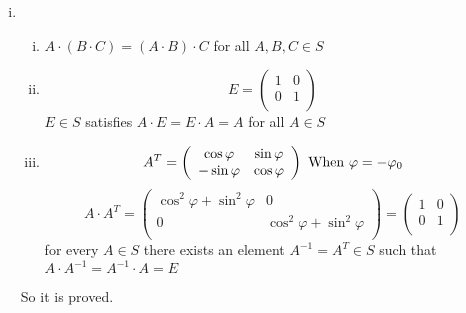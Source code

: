 \documentclass{article}
\begin{document}
\section{}
\begin{enumerate}[i)]
\item
\begin{enumerate}[(i)]
\item
$A\cdot(B\cdot C)=(A\cdot B)\cdot C$ for all $A,B,C\in S$
\item
\begin{equation*}
E=\left(
\begin{array}{cc}
1 & 0\\
0 & 1\\
\end{array}
\right)
\end{equation*}
$E\in S$ satisfies $A\cdot E=E\cdot A=A$ for all $A\in S$
\item
\begin{equation*}
A^T=\left(
\begin{array}{cc}
\cos\varphi & \sin\varphi\\
-\sin\varphi& \cos\varphi\\
\end{array}
\right)\ \rm{When}\ \varphi=-\varphi_0
\end{equation*}
\begin{equation*}
A\cdot A^T=\left(
\begin{array}{cc}
\cos^2\varphi+\sin^2\varphi & 0\\
0 & \cos^2\varphi+\sin^2\varphi\\
\end{array}
\right)=\left(
\begin{array}{cc}
1 & 0\\
0 & 1\\
\end{array}
\right)
\end{equation*}
for every $A\in S$ there exists an element $A^{-1}=A^T\in S$ such that $A\cdot A^{-1}=A^{-1}\cdot A=E$
\end{enumerate}
So it is proved.


\end{enumerate}
\end{document}
